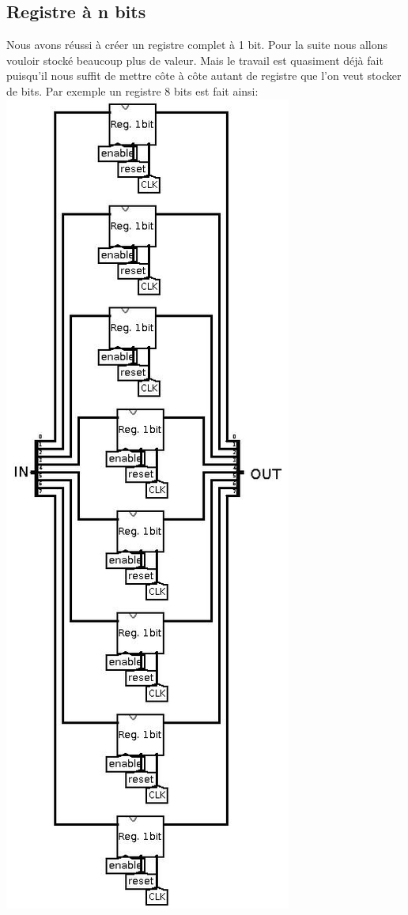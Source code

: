 \documentclass[10pt,a4paper]{article}
\begin{document}
\subsection{Registre à n bits}
Nous avons réussi à créer un registre complet à 1 bit. Pour la suite nous allons vouloir stocké beaucoup plus de valeur. Mais le travail est quasiment déjà fait puisqu'il nous suffit de mettre côte à côte autant de registre que l'on veut stocker de bits. Par exemple un registre 8 bits est fait ainsi:\\
\includegraphics[scale=0.5]{registre8bits.jpg} 
\end{document}
